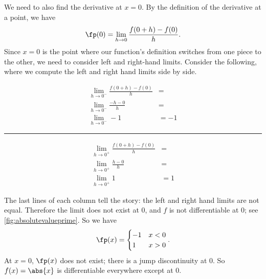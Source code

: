 {We need to also find the derivative at $x=0$. By the definition of the derivative at a point, we have
\[\fp(0) = \lim_{h\to0}\frac{f(0+h)-f(0)}{h}.\]
Since $x=0$ is the point where our function's definition switches from one piece to the other, we need to consider left and right-hand limits. Consider the following, where we compute the left and right hand limits side by side.\\
\begin{minipage}[b]{.49\linewidth}
\begin{align*}
\lim_{h\to0^-}\frac{f(0+h)-f(0)}{h} &= \\
\lim_{h\to0^-}\frac{-h-0}{h} &= \\
\lim_{h\to0^-}-1 & =-1
\end{align*}
\end{minipage}\rule{.5pt}{70pt}%
\begin{minipage}[b]{.49\linewidth}
\begin{align*}
\lim_{h\to0^+}\frac{f(0+h)-f(0)}{h} &= \\
\lim_{h\to0^+}\frac{h-0}{h} &= \\
\lim_{h\to0^+}1 & =1
\end{align*}
\end{minipage}
%
%
The last lines of each column tell the story: the left and right hand limits are not equal. Therefore the limit does not exist at 0, and $f$ is not differentiable at 0; see \autoref{fig:absolutevalueprime}.
So we have
\[\fp(x) = \begin{cases} -1 & x<0 \\ 1 & x>0\end{cases}.\] 
At $x=0$, $\fp(x)$ does not exist; there is a jump discontinuity at 0. So $f(x) = \abs{x}$ is differentiable everywhere except at 0.}


